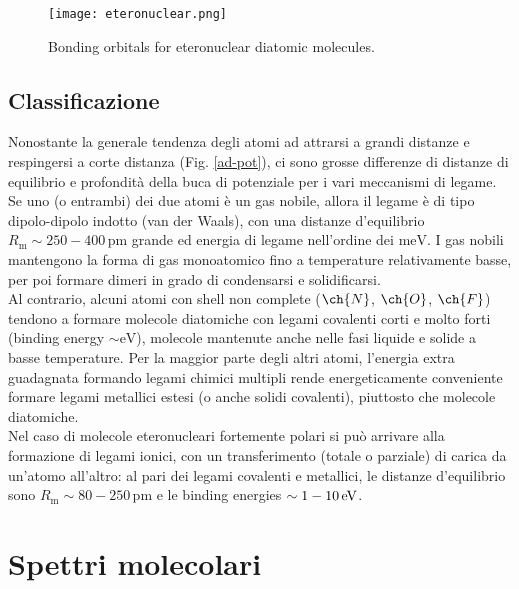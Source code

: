 \begin{figure}
	\centering
	\texttt{[image: eteronuclear.png]}
	\caption{Bonding orbitals for eteronuclear diatomic molecules.}
	\label{etero}
\end{figure}

\subsection{Classificazione}

Nonostante la generale tendenza degli atomi ad attrarsi a grandi distanze e respingersi a corte distanza (Fig. \ref{ad-pot}), ci sono grosse differenze di distanze di equilibrio e profondità della buca di potenziale per i vari meccanismi di legame. \\
Se uno (o entrambi) dei due atomi è un gas nobile, allora il legame è di tipo dipolo-dipolo indotto (van der Waals), con una distanze d'equilibrio $ R_\text{m} \sim 250-400 \,\text{pm} $ grande ed energia di legame nell'ordine dei $ \text{meV} $. I gas nobili mantengono la forma di gas monoatomico fino a temperature relativamente basse, per poi formare dimeri in grado di condensarsi e solidificarsi. \\
Al contrario, alcuni atomi con shell non complete ($ \ch{N} $, $ \ch{O} $, $ \ch{F} $) tendono a formare molecole diatomiche con legami covalenti corti e molto forti (binding energy $ \sim \text{eV} $), molecole mantenute anche nelle fasi liquide e solide a basse temperature. Per la maggior parte degli altri atomi, l'energia extra guadagnata formando legami chimici multipli rende energeticamente conveniente formare legami metallici estesi (o anche solidi covalenti), piuttosto che molecole diatomiche.\\
Nel caso di molecole eteronucleari fortemente polari si può arrivare alla formazione di legami ionici, con un transferimento (totale o parziale) di carica da un'atomo all'altro: al pari dei legami covalenti e metallici, le distanze d'equilibrio sono $ R_\text{m} \sim 80-250 \,\text{pm} $ e le binding energies $ \sim 1-10\,\mathrm{eV} $.

\section{Spettri molecolari}

